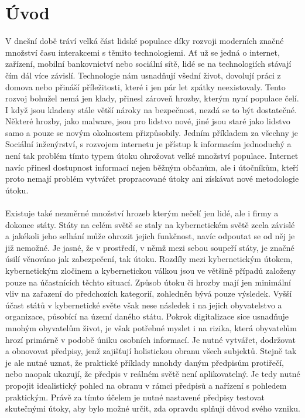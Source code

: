 
\section{Úvod}\label{sec:uvod}
V dnešní době tráví velká část lidské populace díky rozvoji moderních značné množství času interakcemi s těmito technologiemi.
Ať už se jedná o internet,  zařízení, mobilní bankovnictví nebo sociální sítě, lidé se na technologiích stávají čím dál více závislí.
Technologie nám usnadňují všední život, dovolují práci z domova nebo přináší příležitosti, které i jen pár let zpátky neexistovaly.
Tento rozvoj bohužel nemá jen klady, přinesl zároveň hrozby, kterým nyní populace čelí.
I když jsou kladeny stále větší nároky na bezpečnost, nezdá se to být dostatečné.
Některé hrozby, jako malware, jsou pro lidstvo nové, jiné jsou staré jako lidstvo samo a pouze se novým okolnostem přizpůsobily.
Jedním příkladem za všechny je Sociální inženýrství, s rozvojem internetu je přístup k informacím jednoduchý a není tak problém tímto typem útoku ohrožovat velké množství populace.
Internet navíc přinesl dostupnost informací nejen běžným občanům, ale i útočníkům, kteří proto nemají problém vytvářet propracované útoky ani získávat nové metodologie útoku.

\paragraph{}
Existuje také nezměrné množství hrozeb kterým nečelí jen lidé, ale i firmy a dokonce státy.
Státy na celém světě se staly na kybernetickém světě zcela závislé a jakékoli jeho selhání může ohrozit jejich funkčnost, navíc odpoutat se od něj je již nemožné\cite{LI20218176}.
Je jasné, že v prostředí, v němž mezi sebou soupeří státy, je značné úsilí věnováno jak zabezpečení, tak útoku.
Rozdíly mezi kybernetickým útokem, kybernetickým zločinem a kybernetickou válkou jsou ve většině případů založeny pouze na účastnících těchto situací\cite{LI20218176, Enisa_thread_landscape}.
Způsob útoku či hrozby mají jen minimální vliv na zařazení do předchozích kategorií, zohledněn bývá pouze výsledek.
Vyšší účast států v kybernetické světe však nese následek i na jejich obyvatelstvo a organizace, působící na území daného státu.
Pokrok digitalizace sice usnadňuje mnohým obyvatelům život, je však potřebné myslet i na rizika, která obyvatelům hrozí primárně v podobě úniku osobních informací.
Je nutné vytvářet, dodržovat a obnovovat předpisy, jenž zajišťují holistickou obranu všech subjektů.
Stejně tak je ale nutné uznat, že praktické příklady mnohdy daným předpisům protiřečí, nebo naopak ukazují, že předpis v reálném světě není aplikovatelný.
Je tedy nutné propojit idealistický pohled na obranu v rámci předpisů a nařízení s pohledem praktickým.
Právě za tímto účelem je nutné nastavené předpisy testovat skutečnými útoky, aby bylo možné určit, zda opravdu splňují důvod svého vzniku.

